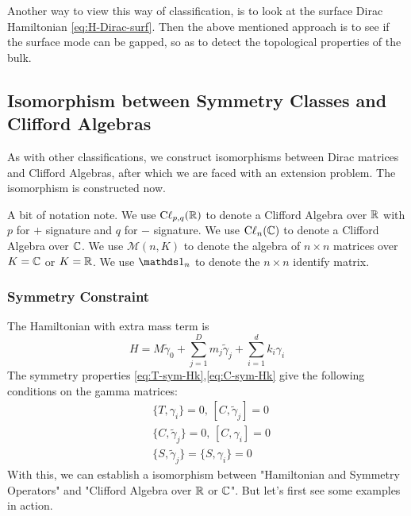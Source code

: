 Another way to view this way of classification, is to look at the surface
Dirac Hamiltonian \ref{eq:H-Dirac-surf}. Then the above mentioned approach is to
see if the surface mode can be gapped, so as to detect the topological
properties of the bulk.

\subsection{Isomorphism between Symmetry Classes and Clifford Algebras}
\label{sec:Isomorphism}
As with other classifications, we construct isomorphisms between Dirac matrices
and Clifford Algebras, after which we are faced with an extension problem. The
isomorphism is constructed now. 

A bit of notation note. We use $\mathrm{C\ell}_{p,q}(\mathbb{R})$ to denote a Clifford
Algebra over $\mathbb{R}$ with $p$ for $+$ signature and $q$ for $-$ signature. We use
$\mathrm{C\ell}_{n}(\mathbb{C})$ to denote a Clifford Algebra over $\mathbb{C}$. We use
$\mathcal{M}(n,K)$ to denote the algebra of $n\times n$ matrices over $K=\mathbb{C}$ or
$K=\mathbb{R}$. We use $\id_n$ to denote the $n\times n$ identify matrix.

\subsubsection{Symmetry Constraint}
\label{sec:Symmetry Constraint}
The Hamiltonian with extra mass term is
\begin{equation}
    H = M\tilde{\gamma}_0 + \sum_{j=1}^D m_j\tilde{\gamma}_j
    + \sum_{i=1}^{d} k_i \gamma_i
\end{equation}
The symmetry properties \ref{eq:T-sym-Hk},\ref{eq:C-sym-Hk} give the following
conditions on the gamma matrices:
\begin{subequations}
    \label{eq:sym-spemt}
\begin{align}
    & \{T,\gamma_i \} = 0,\, [C,\tilde{\gamma}_j] =0 \\
    & \{C,\tilde{\gamma}_j \} = 0,\, [C,\gamma_i] =0 \\
    & \{S,\tilde{\gamma}_j \} = \{S,\gamma_i\} =0
\end{align}
\end{subequations}
With this, we can establish a isomorphism between "Hamiltonian and Symmetry
Operators" and "Clifford Algebra over $\mathbb{R}$ or $\mathbb{C}$".  But let's first see some
examples in action.

